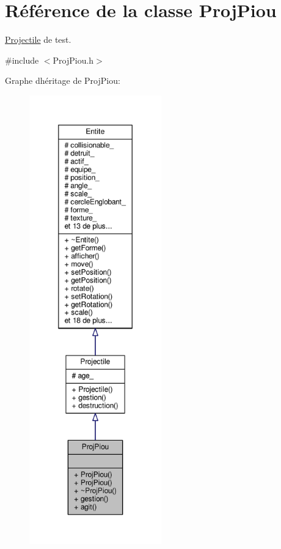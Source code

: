 \hypertarget{class_proj_piou}{}\section{Référence de la classe Proj\+Piou}
\label{class_proj_piou}


\hyperlink{class_projectile}{Projectile} de test.  




{\ttfamily \#include $<$Proj\+Piou.\+h$>$}



Graphe d\textquotesingle{}héritage de Proj\+Piou\+:\nopagebreak
\begin{figure}[H]
\begin{center}
\leavevmode
\includegraphics[height=550pt]{class_proj_piou__inherit__graph}
\end{center}
\end{figure}


